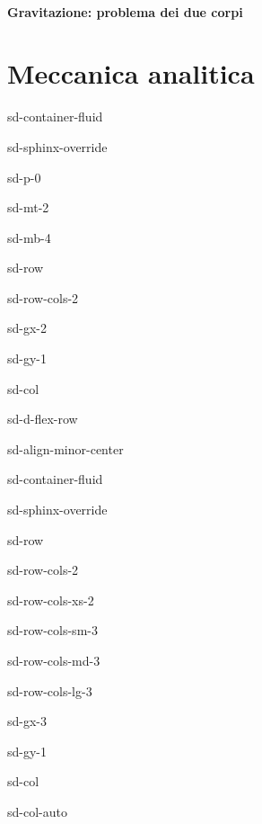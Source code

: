 \documentclass[letterpaper,10pt,english]{jupyterBook}
\begin{document}
\subsection{Gravitazione: problema dei due corpi}
\label{\detokenize{ch/dynamics-motions-gravitation-2bodies:gravitazione-problema-dei-due-corpi}}\label{\detokenize{ch/dynamics-motions-gravitation-2bodies:classical-mechanics-dynamics-motions-gravitation-2bodies}}\label{\detokenize{ch/dynamics-motions-gravitation-2bodies::doc}}
\sphinxstepscope


\part{Meccanica analitica}

\sphinxstepscope

\begin{sphinxuseclass}{sd-container-fluid}
\begin{sphinxuseclass}{sd-sphinx-override}
\begin{sphinxuseclass}{sd-p-0}
\begin{sphinxuseclass}{sd-mt-2}
\begin{sphinxuseclass}{sd-mb-4}
\begin{sphinxuseclass}{sd-row}
\begin{sphinxuseclass}{sd-row-cols-2}
\begin{sphinxuseclass}{sd-gx-2}
\begin{sphinxuseclass}{sd-gy-1}
\begin{sphinxuseclass}{sd-col}
\begin{sphinxuseclass}{sd-d-flex-row}
\begin{sphinxuseclass}{sd-align-minor-center}
\begin{sphinxuseclass}{sd-container-fluid}
\begin{sphinxuseclass}{sd-sphinx-override}
\begin{sphinxuseclass}{sd-row}
\begin{sphinxuseclass}{sd-row-cols-2}
\begin{sphinxuseclass}{sd-row-cols-xs-2}
\begin{sphinxuseclass}{sd-row-cols-sm-3}
\begin{sphinxuseclass}{sd-row-cols-md-3}
\begin{sphinxuseclass}{sd-row-cols-lg-3}
\begin{sphinxuseclass}{sd-gx-3}
\begin{sphinxuseclass}{sd-gy-1}
\begin{sphinxuseclass}{sd-col}
\begin{sphinxuseclass}{sd-col-auto}

\end{sphinxuseclass}
\end{sphinxuseclass}
\end{sphinxuseclass}
\end{sphinxuseclass}
\end{sphinxuseclass}
\end{sphinxuseclass}
\end{sphinxuseclass}
\end{sphinxuseclass}
\end{sphinxuseclass}
\end{sphinxuseclass}
\end{sphinxuseclass}
\end{sphinxuseclass}
\end{sphinxuseclass}
\end{sphinxuseclass}
\end{sphinxuseclass}
\end{sphinxuseclass}
\end{sphinxuseclass}
\end{sphinxuseclass}
\end{sphinxuseclass}
\end{sphinxuseclass}
\end{sphinxuseclass}
\end{sphinxuseclass}
\end{sphinxuseclass}
\end{sphinxuseclass}
\end{document}
